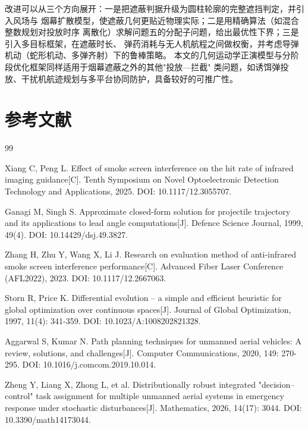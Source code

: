 \documentclass[12pt, a4paper]{article}
\begin{document}
改进可以从三个方向展开：一是把遮蔽判据升级为圆柱轮廓的完整遮挡判定，并引入风场与
烟幕扩散模型，使遮蔽几何更贴近物理实际；二是用精确算法（如混合整数规划对投放时序
离散化）求解问题五的分配子问题，给出最优性下界；三是引入多目标框架，在遮蔽时长、
弹药消耗与无人机航程之间做权衡，并考虑导弹机动（蛇形机动、多弹齐射）下的鲁棒策略。
本文的几何运动学正演模型与分阶段优化框架同样适用于烟幕遮蔽之外的其他"投放—拦截"
类问题，如诱饵弹投放、干扰机航迹规划与多平台协同防护，具备较好的可推广性。
\section*{参考文献}

\begin{thebibliography}{99}

Xiang C, Peng L. Effect of smoke screen interference on the hit rate of infrared imaging guidance[C]. Tenth Symposium on Novel Optoelectronic Detection Technology and Applications, 2025. DOI: 10.1117/12.3055707.

Ganagi M, Singh S. Approximate closed-form solution for projectile trajectory and its applications to lead angle computations[J]. Defence Science Journal, 1999, 49(4). DOI: 10.14429/dsj.49.3827.

Zhang H, Zhu Y, Wang X, Li J. Research on evaluation method of anti-infrared smoke screen interference performance[C]. Advanced Fiber Laser Conference (AFL2022), 2023. DOI: 10.1117/12.2667063.

Storn R, Price K. Differential evolution -- a simple and efficient heuristic for global optimization over continuous spaces[J]. Journal of Global Optimization, 1997, 11(4): 341-359. DOI: 10.1023/A:1008202821328.

Aggarwal S, Kumar N. Path planning techniques for unmanned aerial vehicles: A review, solutions, and challenges[J]. Computer Communications, 2020, 149: 270-295. DOI: 10.1016/j.comcom.2019.10.014.

Zheng Y, Liang X, Zhong L, et al. Distributionally robust integrated "decision--control" task assignment for multiple unmanned aerial systems in emergency response under stochastic disturbances[J]. Mathematics, 2026, 14(17): 3044. DOI: 10.3390/math14173044.

\end{thebibliography}
\end{document}
